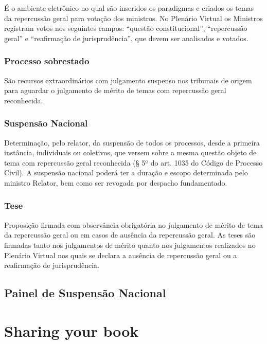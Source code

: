 \documentclass[
]{book}
\begin{document}
É o ambiente eletrônico no qual são inseridos os paradigmas e criados os temas da repercussão geral para votação dos ministros. No Plenário Virtual os Ministros registram votos nos seguintes campos: ``questão constitucional'', ``repercussão geral'' e ``reafirmação de jurisprudência'', que devem ser analisados e votados.

\hypertarget{processo-sobrestado}{%
\subsection{Processo sobrestado}\label{processo-sobrestado}}

São recursos extraordinários com julgamento suspenso nos tribunais de origem para aguardar o julgamento de mérito de temas com repercussão geral reconhecida.

\hypertarget{suspensuxe3o-nacional}{%
\subsection{Suspensão Nacional}\label{suspensuxe3o-nacional}}

Determinação, pelo relator, da suspensão de todos os processos, desde a primeira instância, individuais ou coletivos, que versem sobre a mesma questão objeto de tema com repercussão geral reconhecida (§ 5º do art. 1035 do Código de Processo Civil). A suspensão nacional poderá ter a duração e escopo determinada pelo ministro Relator, bem como ser revogada por despacho fundamentado.

\hypertarget{tese}{%
\subsection{Tese}\label{tese}}

Proposição firmada com observância obrigatória no julgamento de mérito de tema da repercussão geral ou em casos de ausência da repercussão geral. As teses são firmadas tanto nos julgamentos de mérito quanto nos julgamentos realizados no Plenário Virtual nos quais se declara a ausência de repercussão geral ou a reafirmação de jurisprudência.

\hypertarget{painel-de-suspensuxe3o-nacional}{%
\section{Painel de Suspensão Nacional}\label{painel-de-suspensuxe3o-nacional}}

\hypertarget{sharing-your-book}{%
\chapter{Sharing your book}\label{sharing-your-book}}
\end{document}
